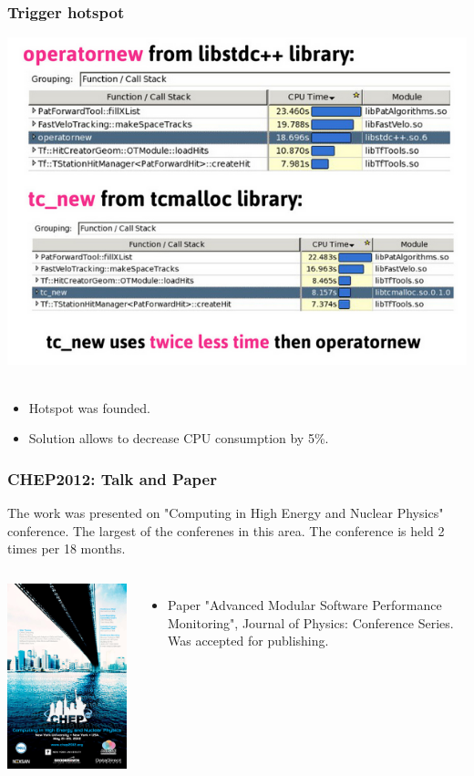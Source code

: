 \documentclass{beamer}
\begin{document}
\begin{frame}
\frametitle{Trigger hotspot}
\includegraphics[width=.7\textwidth]{images/hlt.png}\\~\\
\begin{itemize}
  \item Hotspot was founded.
  \item Solution allows to decrease CPU consumption by 5\%.
\end{itemize}
\end{frame}
\begin{frame}
\frametitle{CHEP2012: Talk and Paper}
The work was presented on "Computing in High Energy and Nuclear Physics" conference.
The largest of the conferenes in this area. The conference is held  2 times per 18 months.
\begin{columns}[l]
\includegraphics[height=.6\textheight]{images/chep.png}
\begin{itemize}
    \item Paper "Advanced Modular Software Performance Monitoring", Journal of Physics: Conference Series. Was accepted for publishing.
\end{itemize}
\end{columns}
\end{frame}
\end{document}
